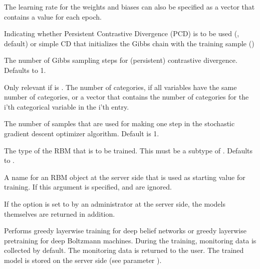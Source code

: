 \begin{Arguments}
\begin{ldescription}
\item[\code{learningrates}] The learning rate for the weights and biases
can also be specified as a vector that contains a value for each epoch.

\item[\code{pcd}] Indicating whether Persistent Contrastive Divergence (PCD) is to
be used (, default) or simple CD that initializes the Gibbs chain with
the training sample ()

\item[\code{cdsteps}] The number of Gibbs sampling steps for (persistent)
contrastive divergence. Defaults to 1.

\item[\code{categories}] Only relevant if  is .
The number of categories, if all variables have the same number
of categories, or a vector that contains the number of categories
for the i'th categorical variable in the i'th entry.

\item[\code{batchsize}] The number of samples that are used for making one step in the
stochastic gradient descent optimizer algorithm. Default is 1.

\item[\code{rbmtype}] The type of the RBM that is to be trained.
This must be a subtype of . Defaults to .

\item[\code{startrbm}] A name for an RBM object at the server side that
is used as starting value for training.
If this argument is specified,  and  are ignored.
\end{ldescription}
\end{Arguments}
%
\begin{Details}\relax
If the option  is set to 
by an administrator at the server side, the models themselves are returned in addition.
\end{Details}
%
\begin{Description}\relax
Performs greedy layerwise training for deep belief networks or greedy layerwise
pretraining for deep Boltzmann machines.
During the training, monitoring data is collected by default.
The monitoring data is returned to the user.
The trained model is stored on the server side (see parameter ).
\end{Description}

